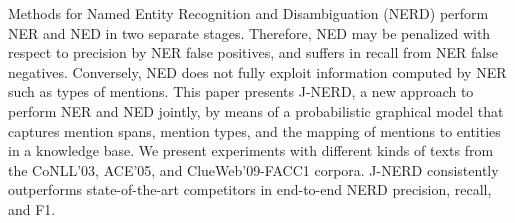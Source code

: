 Methods for Named Entity Recognition and Disambiguation (NERD) perform NER and NED in two separate stages. Therefore, NED may be penalized with respect to precision by NER false positives, and suffers in recall from NER false negatives. Conversely, NED does not fully exploit information computed by NER such as types of mentions. This paper presents J-NERD, a new approach to perform NER and NED jointly, by means of a probabilistic graphical model that captures mention spans, mention types, and the mapping of mentions to entities in a knowledge base. We present experiments with different kinds of texts from the CoNLL'03, ACE'05, and ClueWeb'09-FACC1 corpora. J-NERD consistently outperforms state-of-the-art competitors in end-to-end NERD precision, recall, and F1.

